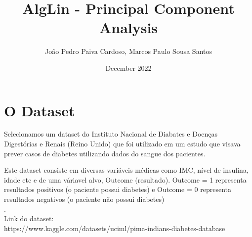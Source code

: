 \documentclass{article}
\title{AlgLin - Principal Component Analysis}
\author{João Pedro Paiva Cardoso, Marcos Paulo Sousa Santos}
\date{December 2022}
\begin{document}
\maketitle

\section{O Dataset}
\par
Selecionamos um dataset do Instituto Nacional de Diabates e Doenças Digestórias e Renais (Reino Unido) que foi utilizado em um estudo que visava prever casos de diabetes utilizando dados do sangue dos pacientes.\par 
Este dataset consiste em diversas variáveis médicas como IMC, nível de insulina, idade etc e de uma váriavel alvo, Outcome (resultado). Outcome = 1 representa resultados positivos (o paciente possui diabetes) e Outcome = 0 representa resultados negativos (o paciente não possui diabetes)\\.
\\
Link do dataset:\\
https://www.kaggle.com/datasets/uciml/pima-indians-diabetes-database
\end{document}

